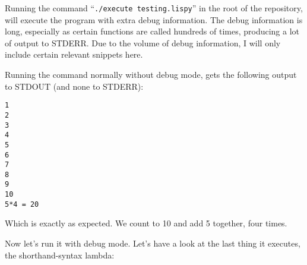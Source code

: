 \documentclass{article}
\newcommand{\code}[1]{\texttt{#1}}
\begin{document}
    Running the command ``\code{./execute testing.lispy}'' in the root of
    the repository, will execute the program with extra debug information.
    The debug information is long, especially as certain functions are called hundreds
    of times, producing a lot of output to STDERR. Due to the volume of debug
    information, I will only include certain relevant snippets here.

    Running the command normally without debug mode, gets the following output
    to STDOUT (and none to STDERR):

    \begin{Verbatim}
1
2
3
4
5
6
7
8
9
10
5*4 = 20
    \end{Verbatim}

    Which is exactly as expected. We count to 10 and add 5 together, four times.

\clearpage

    Now let's run it with debug mode. Let's have a look at the last thing it executes,
    the shorthand-syntax lambda:
\end{document}
